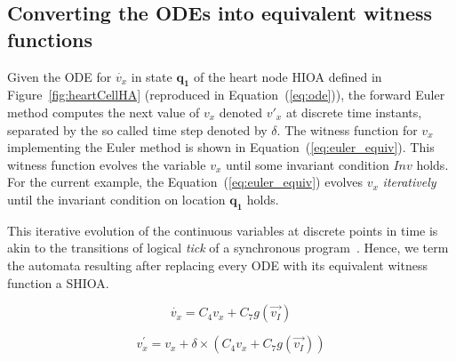 \subsection{Converting the ODEs into equivalent witness functions}
\label{sec:converting-odes-into}

Given the \ac{ODE} for $\dot{v_x}$ in state $\mathbf{q_1}$ of the heart
node \ac{HIOA} defined in Figure~\ref{fig:heartCellHA} (reproduced in
Equation~(\ref{eq:ode})), the forward Euler method computes the next
value of $v_{x}$ denoted $v'_{x}$ at discrete time instants, separated
by the so called time step denoted by $\delta$. The witness function for
$v_{x}$ implementing the Euler method is shown in
Equation~(\ref{eq:euler_equiv}). This witness function evolves the
variable $v_{x}$ until some invariant condition $Inv$ holds. For the
current example, the Equation~(\ref{eq:euler_equiv}) evolves $v_{x}$
\emph{iteratively} until the invariant condition on location
$\mathbf{q_{1}}$ holds. 

This iterative evolution of the continuous variables at discrete points
in time is akin to the transitions of logical \emph{tick} of a
synchronous program~\cite{benveniste03}. Hence, we term the automata
resulting after replacing every ODE with its equivalent witness function
a \ac{SHIOA}.


\begin{equation}
  \dot{v_x} = C_{4} v_x + C_{7} g(\vec{v_{I}})
  \label{eq:ode}
\end{equation}

\begin{equation}
  v^\prime_x = v_x + \delta \times (C_{4} v_x + C_{7} g(\vec{v_{I}}))
  \label{eq:euler_equiv}
\end{equation}


